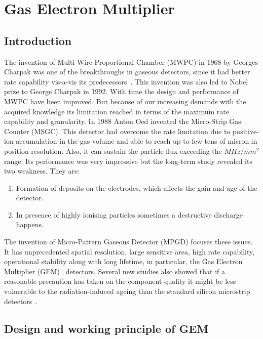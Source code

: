 \chapter{Gas Electron Multiplier} %
\label{cha:gas_electron_multiplier}

\section{Introduction} %
\label{sec:introduction}
The invention of Multi-Wire Proportional Chamber (MWPC) in 1968 by Georges Charpak was one of the breakthroughs in gaseous detectors, since it had better rate capability vis-a-vis its predecessors~\cite{Charpak1968}. 
This invention was also led to Nobel prize to George Charpak in 1992. With time the design and performance of MWPC have been improved. But because of our increasing demands with the acquired knowledge its limitation reached in terms of the maximum rate capability and granularity. In 1988 Anton Oed invented the Micro-Strip Gas Counter (MSGC). 
This detector had overcome the rate limitation due to positive-ion accumulation in the gas volume and able to reach up to few tens of micron in position resolution. 
Also, it can sustain the particle flux exceeding the $MHz/mm^2$ range. Its performance was very impressive but the long-term study revealed its two weakness. They are:
\begin{enumerate}
	\item Formation of deposits on the electrodes, which affects the gain and age of the detector.
	\item In presence of highly ionising particles sometimes a destructive discharge happens.
\end{enumerate}
The invention of Micro-Pattern Gaseous Detector (MPGD) focuses these issues. 
It has unprecedented spatial resolution, large sensitive area, high rate capability, operational stability along with long lifetime, in particular, the Gas Electron Multiplier (GEM)~\cite{Sauli1997,Sauli1999,detector:1732870} detectors. 
Several new studies also showed that if a reasonable precaution has taken on the component quality it might be less vulnerable to the radiation-induced ageing than the standard silicon microstrip detectors~\cite{TITOV2004,Titov2002}.

\section{Design and working principle of GEM} %
\label{sec:design_and_working_principle_of_gem}

